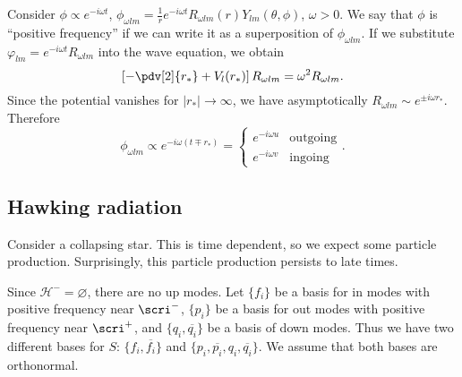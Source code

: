 \documentclass{jknotes}
\begin{document}
Consider \(\phi\propto e^{-i\omega t}\), \(\phi_{\omega l m} = \frac{1}{r} e^{-i\omega t}R_{\omega l m}(r)Y_{lm}(\theta,\phi)\), \(\omega>0\). We say that \(\phi\) is ``positive frequency'' if we can write it as a superposition of \(\phi_{\omega l m}\). If we substitute \(\varphi_{lm} = e^{-i\omega t}R_{\omega l m}\) into the wave equation, we obtain
\begin{equation}
    \left[-\pdv[2]{r_*} + V_l(r_*)\right] R_{\omega l m} = \omega^2 R_{\omega l m}.
\end{equation}
Since the potential vanishes for \(|r_*| \to \infty\), we have asymptotically \(R_{\omega l m} \sim e^{\pm i \omega r_*}\). Therefore
\begin{equation}
    \phi_{\omega l m} \propto e^{-i\omega(t\mp r_*)} = 
    \begin{cases}
        e^{-i\omega u} & \text{outgoing}\\
        e^{-i\omega v} & \text{ingoing}
    \end{cases}.
\end{equation}

\subsection{Hawking radiation}
Consider a collapsing star. This is time dependent, so we expect some particle production. Surprisingly, this particle production persists to late times.

Since \(\mathcal{H}^- = \varnothing\), there are no up modes. Let \(\{f_i\}\) be a basis for in modes with positive frequency near \(\scri^-\), \(\{p_i\}\) be a basis for out modes with positive frequency near \(\scri^+\), and \(\{q_i,\overline{q_i}\}\) be a basis of down modes. Thus we have two different bases for \(S\): \(\{f_i,\overline{f_i}\}\) and \(\{p_i,\overline{p_i},q_i,\overline{q_i}\}\). We assume that both bases are orthonormal.
\end{document}
